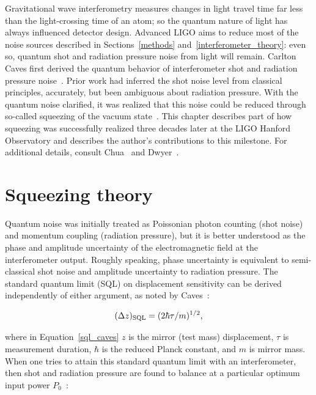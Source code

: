 


Gravitational wave interferometry measures changes in light travel time far less than the light-crossing time of an atom; so the quantum nature of light has always influenced detector design.
Advanced LIGO aims to reduce most of the noise sources described in Sections~\ref{methods} and~\ref{interferometer_theory}: even so, quantum shot and radiation pressure noise from light will remain.
Carlton Caves first derived the quantum behavior of interferometer shot and radiation pressure noise~\cite{Caves1980}.
Prior work had inferred the shot noise level from classical principles, accurately, but been ambiguous about radiation pressure.
With the quantum noise clarified, it was realized that this noise could be reduced through so-called squeezing of the vacuum state~\cite{Caves1981}.
This chapter describes part of how squeezing was successfully realized three decades later at the LIGO Hanford Observatory and describes the author's contributions to this milestone.
For additional details, consult Chua~\cite{ChuaThesis} and Dwyer~\cite{DwyerThesis}.

    \section{Squeezing theory}
    \label{squeezing_theory}

Quantum noise was initially treated as Poissonian photon counting (shot noise) and momentum coupling (radiation pressure), but it is better understood as the phase and amplitude uncertainty of the electromagnetic field at the interferometer output. 
Roughly speaking, phase uncertainty is equivalent to semi-classical shot noise and amplitude uncertainty to radiation pressure.
The standard quantum limit (SQL) on displacement sensitivity can be derived independently of either argument, as noted by Caves~\cite{Caves1981}:

\begin{equation}
(\Delta z)_{\textup{SQL}} = (2 \hbar \tau / m)^{1/2},
\label{sql_caves}
\end{equation}

\noindent where in Equation~\ref{sql_caves} $z$ is the mirror (test mass) displacement, $\tau$ is measurement duration, $\hbar$ is the reduced Planck constant, and $m$ is mirror mass.
When one tries to attain this standard quantum limit with an interferometer, then shot and radiation pressure are found to balance at a particular optimum input power $P_0$~\cite{Caves1981}:


